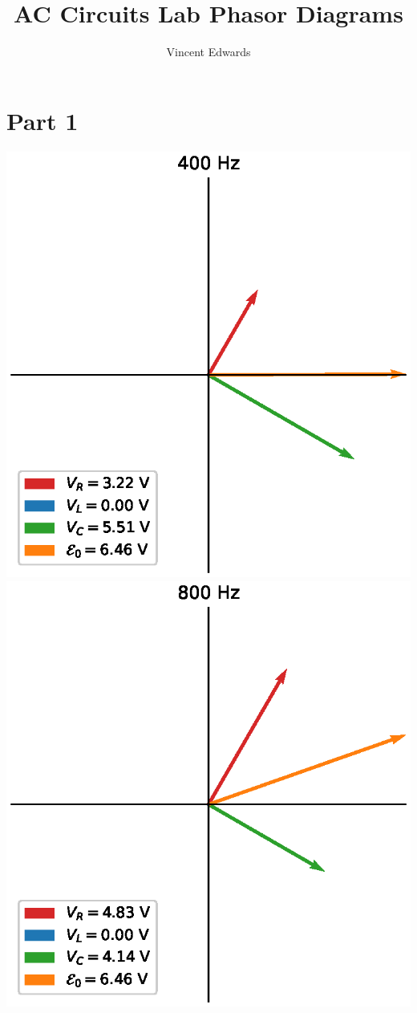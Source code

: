 \documentclass[12pt]{iopart} %
\begin{document}
\title{AC Circuits Lab Phasor Diagrams}
\author{Vincent Edwards}

\section*{Part 1}

\includegraphics{media/part_1_400_hz.eps}
\includegraphics{media/part_1_800_hz.eps}
\end{document}
